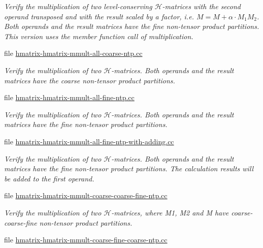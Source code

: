 \begin{DoxyCompactItemize}
\begin{DoxyCompactList}\small\item\em Verify the multiplication of two level-\/conserving $\mathcal{H}$-\/matrices with the second operand transposed and with the result scaled by a factor, i.\+e. $M = M + \alpha \cdot M_1 M_2$. Both operands and the result matrices have the fine non-\/tensor product partitions. This version uses the member function call of multiplication. \end{DoxyCompactList}\item 
file \hyperlink{hmatrix-hmatrix-mmult-all-coarse-ntp_8cc}{hmatrix-\/hmatrix-\/mmult-\/all-\/coarse-\/ntp.\+cc}
\begin{DoxyCompactList}\small\item\em Verify the multiplication of two $\mathcal{H}$-\/matrices. Both operands and the result matrices have the coarse non-\/tensor product partitions. \end{DoxyCompactList}\item 
file \hyperlink{hmatrix-hmatrix-mmult-all-fine-ntp_8cc}{hmatrix-\/hmatrix-\/mmult-\/all-\/fine-\/ntp.\+cc}
\begin{DoxyCompactList}\small\item\em Verify the multiplication of two $\mathcal{H}$-\/matrices. Both operands and the result matrices have the fine non-\/tensor product partitions. \end{DoxyCompactList}\item 
file \hyperlink{hmatrix-hmatrix-mmult-all-fine-ntp-with-adding_8cc}{hmatrix-\/hmatrix-\/mmult-\/all-\/fine-\/ntp-\/with-\/adding.\+cc}
\begin{DoxyCompactList}\small\item\em Verify the multiplication of two $\mathcal{H}$-\/matrices. Both operands and the result matrices have the fine non-\/tensor product partitions. The calculation results will be added to the first operand. \end{DoxyCompactList}\item 
file \hyperlink{hmatrix-hmatrix-mmult-coarse-coarse-fine-ntp_8cc}{hmatrix-\/hmatrix-\/mmult-\/coarse-\/coarse-\/fine-\/ntp.\+cc}
\begin{DoxyCompactList}\small\item\em Verify the multiplication of two $\mathcal{H}$-\/matrices, where M1, M2 and M have coarse-\/coarse-\/fine non-\/tensor product partitions. \end{DoxyCompactList}\item 
file \hyperlink{hmatrix-hmatrix-mmult-coarse-fine-coarse-ntp_8cc}{hmatrix-\/hmatrix-\/mmult-\/coarse-\/fine-\/coarse-\/ntp.\+cc}

\end{DoxyCompactItemize}
